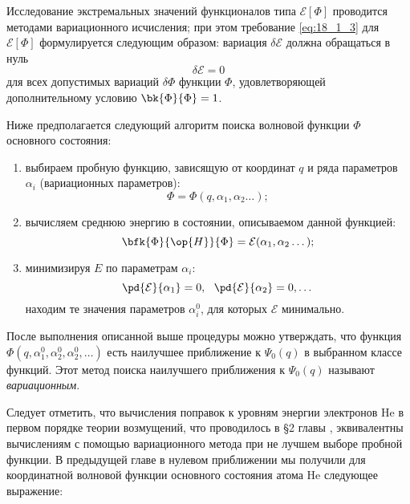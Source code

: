 
Исследование экстремальных значений функционалов типа $\mathcal{E}[\Phi]$ проводится методами вариационного исчисления; при этом требование \eqref{eq:18_1_3} для $\mathcal{E}[\Phi]$ формулируется следующим образом: вариация $\delta \mathcal{E}$ должна обращаться в нуль
\begin{equation}
\label{eq:18_1_4}
\delta \mathcal{E} = 0
\end{equation}
для всех допустимых вариаций $\delta\Phi$ функции $\Phi$, удовлетворяющей дополнительному условию $\bk{\Phi}{\Phi} = 1$.

Ниже предполагается следующий алгоритм поиска волновой функции $\Phi$ основного состояния:
\begin{enumerate}
\item выбираем пробную функцию, зависящую от координат $q$ и ряда параметров $\alpha_i$ (вариационных параметров):
$$
\Phi = \Phi(q, \alpha_1, \alpha_2 \dots );
$$
\item вычисляем среднюю энергию в состоянии, описываемом данной функцией:
$$
\bfk{\Phi}{\op{H}}{\Phi} = \mathcal{E}(\alpha_1, \alpha_2 \dots);
$$
\item минимизируя $E$ по параметрам $\alpha_i$:
$$
\pd{\mathcal{E}}{\alpha_1} = 0,~~ \pd{\mathcal{E}}{\alpha_2} = 0, \dots
$$
находим те значения параметров $\alpha_i^0$, для которых $\mathcal{E}$ минимально.
\end{enumerate}

После выполнения описанной выше процедуры можно утверждать, что функция $\Phi(q, \alpha_1^0, \alpha_2^0, \alpha_2^0, \dots)$ есть наилучшее приближение к $\Psi_0(q)$ в выбранном классе функций. Этот метод поиска наилучшего приближения к $\Psi_0(q)$ называют {\em вариационным}.

Следует отметить, что вычисления поправок к уровням энергии электронов He в первом порядке теории возмущений, что проводилось в \S 2 главы , эквивалентны вычислениям с помощью вариационного метода при не лучшем выборе пробной функции. В предыдущей главе в нулевом приближении мы получили для координатной волновой функции основного состояния атома He следующее выражение:

